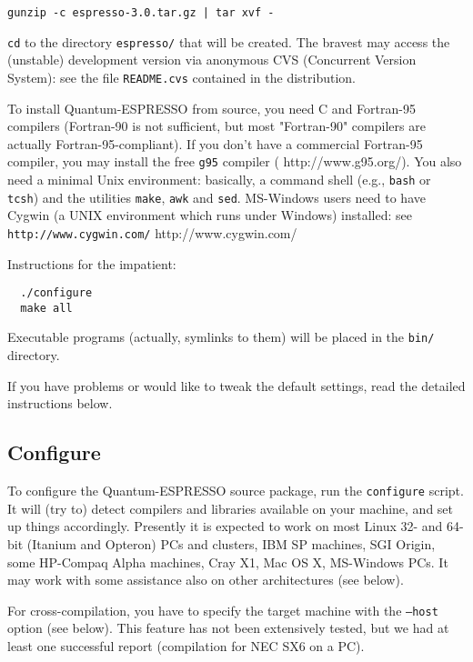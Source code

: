 \documentclass[12pt,a4paper]{article}
\def\stableversion{3.0} %
\begin{document}
\texttt{gunzip -c espresso-\stableversion.tar.gz | tar xvf -}
\medskip

\noindent
\texttt{cd} to the directory \texttt{espresso/} that will be created.
The bravest may access the (unstable) development version via anonymous 
CVS (Concurrent Version System): see the file \texttt{README.cvs}
contained in the distribution.

To install Quantum-ESPRESSO from source, you need C and Fortran-95
compilers (Fortran-90 is not sufficient, but most "Fortran-90"
compilers are actually Fortran-95-compliant).
If you don't have a commercial Fortran-95 compiler, you may install
the free \texttt{g95} compiler
(%
                   {http://www.g95.org/}).
You also need a minimal Unix environment: basically, a command shell
(e.g., \texttt{bash} or \texttt{tcsh}) and the utilities
\texttt{make}, \texttt{awk} and \texttt{sed}.
MS-Windows users need to have Cygwin (a UNIX environment which runs
under Windows) installed: see
\htmladdnormallink%
{\texttt{http://www.cygwin.com/}}%
        {http://www.cygwin.com/}

Instructions for the impatient:
\begin{verbatim}
  ./configure
  make all
\end{verbatim}
Executable programs (actually, symlinks to them) will be placed in the
\texttt{bin/} directory.

If you have problems or would like to tweak the default settings, read
the detailed instructions below.

\subsection{Configure}

To configure the Quantum-ESPRESSO source package, run the \texttt{configure}
script.  It will (try to) detect compilers and libraries available on
your machine, and set up things accordingly.
Presently it is expected to work on most Linux 32- and 64-bit (Itanium
and Opteron) PCs and clusters, IBM SP machines, SGI Origin, some
HP-Compaq Alpha machines, Cray X1, Mac OS X, MS-Windows PCs. 
It may work with 
some assistance also on other architectures (see below).

For cross-compilation, you have to specify the target machine with the
\texttt{--host} option (see below).  This feature has not been 
extensively tested, but we had at least one successful report 
(compilation for NEC SX6 on a PC).
\end{document}
